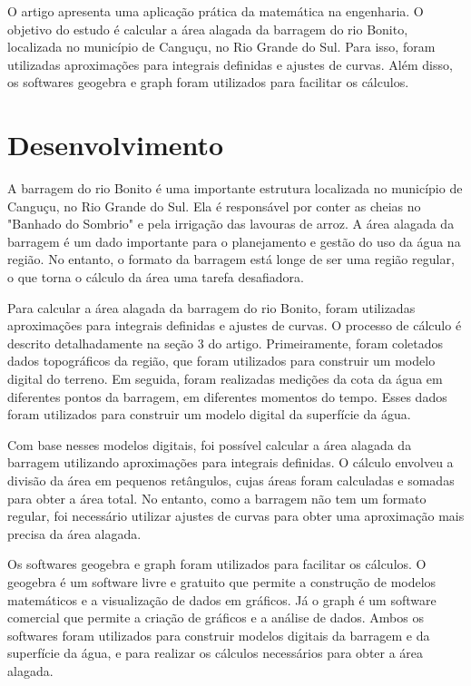 \documentclass[
	12pt,				%
	openright,			%
	oneside,
	a4paper,			%
	chapter=TITLE,		%
	section=TITLE,		%
	sumario=abnt-6027-2012,
	english,			%
	brazil				%
]{abntex2}
\begin{document}
		O artigo apresenta uma aplicação prática da matemática na engenharia. O objetivo do estudo é calcular a área alagada da barragem do rio Bonito, localizada no município de Canguçu, no Rio Grande do Sul. Para isso, foram utilizadas aproximações para integrais definidas e ajustes de curvas. Além disso, os softwares geogebra e graph foram utilizados para facilitar os cálculos. 

			
\chapter{Desenvolvimento}

	A barragem do rio Bonito é uma importante estrutura localizada no município de Canguçu, no Rio Grande do Sul. Ela é responsável por conter as cheias no "Banhado do Sombrio" e pela irrigação das lavouras de arroz. A área alagada da barragem é um dado importante para o planejamento e gestão do uso da água na região. No entanto, o formato da barragem está longe de ser uma região regular, o que torna o cálculo da área uma tarefa desafiadora.
	
	Para calcular a área alagada da barragem do rio Bonito, foram utilizadas aproximações para integrais definidas e ajustes de curvas. O processo de cálculo é descrito detalhadamente na seção 3 do artigo. Primeiramente, foram coletados dados topográficos da região, que foram utilizados para construir um modelo digital do terreno. Em seguida, foram realizadas medições da cota da água em diferentes pontos da barragem, em diferentes momentos do tempo. Esses dados foram utilizados para construir um modelo digital da superfície da água.
	
	Com base nesses modelos digitais, foi possível calcular a área alagada da barragem utilizando aproximações para integrais definidas. O cálculo envolveu a divisão da área em pequenos retângulos, cujas áreas foram calculadas e somadas para obter a área total. No entanto, como a barragem não tem um formato regular, foi necessário utilizar ajustes de curvas para obter uma aproximação mais precisa da área alagada.
	
	Os softwares geogebra e graph foram utilizados para facilitar os cálculos. O geogebra é um software livre e gratuito que permite a construção de modelos matemáticos e a visualização de dados em gráficos. Já o graph é um software comercial que permite a criação de gráficos e a análise de dados. Ambos os softwares foram utilizados para construir modelos digitais da barragem e da superfície da água, e para realizar os cálculos necessários para obter a área alagada.
	
\end{document}
